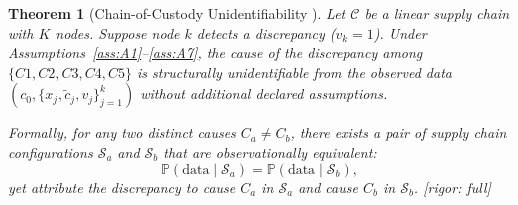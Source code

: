 \documentclass[11pt,a4paper]{article}
\newtheorem{theorem}{Theorem}[section]
\theoremstyle{definition}
\theoremstyle{remark}
\newcommand{\rigorFull}{\textcolor{green!60!black}{[rigor: full]}}
\newcommand{\Pbb}{\mathbb{P}}
\newcommand{\chain}{\mathcal{C}}
\begin{document}
\begin{theorem}[Chain-of-Custody Unidentifiability ]
\label{thm:unident}
Let $\chain$ be a linear supply chain with $K$ nodes. Suppose node $k$ detects a discrepancy ($v_k = 1$). Under Assumptions~\ref{ass:A1}--\ref{ass:A7}, the cause of the discrepancy among $\{C1, C2, C3, C4, C5\}$ is structurally unidentifiable from the observed data $(c_0, \{x_j, \tilde{c}_j, v_j\}_{j=1}^{k})$ without additional declared assumptions.

Formally, for any two distinct causes $C_a \neq C_b$, there exists a pair of supply chain configurations $\mathcal{S}_a$ and $\mathcal{S}_b$ that are observationally equivalent:
\begin{equation}
    \Pbb(\text{data} \mid \mathcal{S}_a) = \Pbb(\text{data} \mid \mathcal{S}_b),
    \label{eq:observational_equivalence}
\end{equation}
yet attribute the discrepancy to cause $C_a$ in $\mathcal{S}_a$ and cause $C_b$ in $\mathcal{S}_b$.
\rigorFull
\end{theorem}
\end{document}
